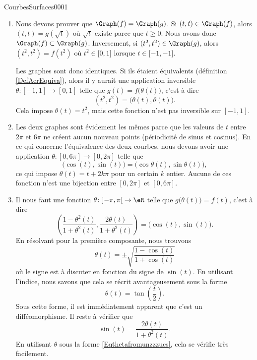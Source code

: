 \begin{corrige}{CourbesSurfaces0001}

	\begin{enumerate}
		\item
			Nous devons prouver que $\Graph(f)=\Graph(g)$. Si $(t,t)\in \Graph(f)$, alors $(t,t)=g(\sqrt{t})$ où $\sqrt{t}$ existe parce que $t\geq 0$. Nous avons donc $\Graph(f)\subset\Graph(g)$. Inversement, si $(t^2,t^2)\in\Graph(g)$, alors $(t^2,t^2)=f(t^2)$ où $t^2\in\mathopen[ 0 , 1 \mathclose]$ lorsque $t\in\mathopen[ -1 , -1 \mathclose]$.

			Les graphes sont donc identiques. Si ils étaient équivalents (définition \ref{DefAcrEquiva}), alors il y aurait une application inversible $\theta\colon [-1,1]\to [0,1]$ telle que $g(t)=f\big( \theta(t) \big)$, c'est à dire
			\begin{equation}
				(t^2,t^2)=\big( \theta(t),\theta(t) \big).
			\end{equation}
			Cela impose $\theta(t)=t^2$, mais cette fonction n'est pas inversible sur $[-1,1]$.

		\item
			Les deux graphes sont évidement les mêmes parce que les valeurs de $t$ entre $2\pi$ et $6\pi$ ne créent aucun nouveau points (périodicité de sinus et cosinus). En ce qui concerne l'équivalence des deux courbes, nous devons avoir une application $\theta\colon [0,6\pi]\to [0,2\pi]$ telle que
			\begin{equation}
				\big( \cos(t),\sin(t) \big)=\big( \cos\theta(t),\sin\theta(t) \big),
			\end{equation}
			ce qui impose $\theta(t)=t+2k\pi$ pour un certain $k$ entier. Aucune de ces fonction n'est une bijection entre $[0,2\pi]$ et $[0,6\pi]$.
		\item
			Il nous faut une fonction $\theta\colon \mathopen] -\pi , \pi \mathclose[\to \eR$ telle que $g\big( \theta(t) \big)=f(t)$, c'est à dire
			\begin{equation}
				\left( \frac{ 1-\theta^2(t) }{ 1+\theta^2(t) },\frac{ 2\theta(t) }{ 1+\theta^2(t) } \right)=\big( \cos(t),\sin(t) \big).
			\end{equation}
			En résolvant pour la première composante, nous trouvons
            \begin{equation}        \label{Eqthetafromunzzzucs}
				\theta(t)=\pm\sqrt{\frac{ 1-\cos(t) }{ 1+\cos(t) }}
			\end{equation}
            où le signe est à discuter en fonction du signe de \( \sin(t)\). En utilisant l'indice, nous savons que cela se récrit avantageusement sous la forme
            \begin{equation}
                \theta(t)=\tan\left( \frac{ t }{2} \right).
            \end{equation}
            Sous cette forme, il est immédiatement apparent que c'est un difféomorphisme. Il reste à vérifier que
            \begin{equation}
                \sin(t)=\frac{ 2\theta(t) }{ 1+\theta^2(t) }.
            \end{equation}
            En utilisant \( \theta\) sous la forme \eqref{Eqthetafromunzzzucs}, cela se vérifie très facilement.


\end{enumerate}
\end{corrige}
